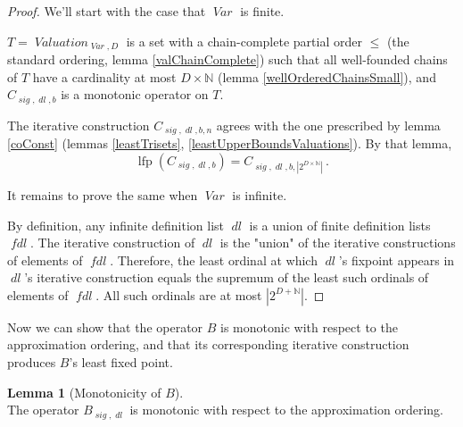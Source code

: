 \documentclass[oneside,12pt]{book}
\theoremstyle{definition}
\newtheorem{lemma}[theorem]{Lemma}
\theoremstyle{remark}
\newcommand\var[1]{\mathop{\mathit{#1}}\nolimits}
\newcommand{\sig}{\var{sig}}
\newcommand{\Var}{\var{Var}}
\DeclareMathOperator{\lfp}{lfp}
\newcommand{\Valuation}{\var{Valuation}}
\newcommand{\dl}{\var{dl}}
\begin{document}
\begin{proof}
  We'll start with the case that $\Var$ is finite.
  
  $T = \Valuation_{\Var,D}$ is a set with a chain-complete partial order $\leq$
  (the standard ordering, lemma \ref{valChainComplete}) such that all well-founded
  chains of $T$ have a cardinality at most $D \times \mathbb{N}$
  (lemma \ref{wellOrderedChainsSmall}), and $C_{\sig,\dl,b}$ is a monotonic
  operator on $T$.
  
  The iterative construction $C_{\sig,\dl,b,n}$ agrees with the one prescribed by
  lemma \ref{coConst} (lemmas \ref{leastTrisets}, \ref{leastUpperBoundsValuations}).
  By that lemma,
  \[\lfp(C_{\sig,\dl,b}) = C_{\sig,\dl,b,|2^{D \times \mathbb{N}}|}\,.\]
  
  It remains to prove the same when $\Var$ is infinite.
  
  By definition, any infinite definition list $\dl$ is a union of finite definition
  lists $\var{fdl}$. The iterative construction of $\dl$ is the "union"\footnotemark
  of the iterative constructions of elements of $\var{fdl}$. Therefore,
  the least ordinal at which $\dl$'s fixpoint appears in $\dl$'s iterative
  construction equals the supremum of the least such ordinals of elements
  of $\var{fdl}$. All such ordinals are at most $|2^{D+\mathbb{N}}|$.
  
\end{proof}

Now we can show that the operator $B$ is monotonic with respect to the approximation
ordering, and that its corresponding iterative construction produces $B$'s least
fixed point.

\begin{lemma}[Monotonicity of $B$] \hfill \\
  The operator $B_{\sig,\dl}$ is monotonic with respect to the approximation ordering.
\end{lemma}
\end{document}
